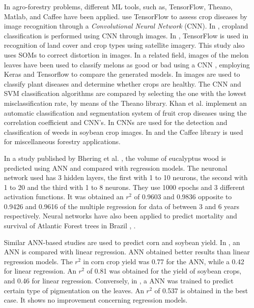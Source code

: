 \documentclass[conference]{IEEEtran}
\begin{document}
In agro-forestry problems, different ML tools, such as, TensorFlow, Theano, Matlab, and Caffee have been applied. \cite{image_recognition1450} use TensorFlow to assess crop diseases by image recognition through a \textit{Convolutional Neural Network} (CNN). In \cite{farmland_scene}, cropland classification is performed using CNN through images. In \cite{deep_learning_class123}, TensorFlow is used in recognition of land cover and crop types using satellite imagery. This study also uses SOMs to correct distortion in images. In a related field, images of the melon leaves have been used to classify melons as good or bad using a CNN \cite{bitter_melon_villa}, employing Keras and Tensorflow to compare the generated models. In \cite{cloud_based_jain} images are used to classify plant diseases and determine whether crops are healthy. The CNN and SVM classification algorithms are compared by selecting the one with the lowest misclassification rate, by means of the Theano library. Khan et al. \cite{CCDF_automatic_khan} implement an automatic classification and segmentation system of fruit crop diseases using the correlation coefficient and CNN's. In \cite{weed_detection_ferreira} CNNs are used for the detection and classification of weeds in soybean crop images. In \cite{CCDF_automatic_khan} and \cite{weed_detection_ferreira} the Caffee library is used for miscellaneous forestry applications.

In a study published by Bhering et al. \cite{application_of_bhering}, the volume of eucalyptus wood is predicted using ANN and compared with regression models. The neuronal network used has 3 hidden layers, the first with 1 to 10 neurons, the second with 1 to 20 and the third with 1 to 8 neurons. They use 1000 epochs and 3 different activation functions. It was obtained an $r^2$ of 0.9603 and 0.9836 opposite to 0.9426 and 0.9616 of the multiple regression for data of between 3 and 6 years respectively. Neural networks have also been applied to predict mortality and survival of Atlantic Forest trees in Brazil \cite{artificial_neural_rocha}, \cite{Estimation_of_Reis}.

Similar ANN-based studies are used to predict corn and soybean yield. In \cite{artificial_neural_kaul}, an ANN is compared with linear regression. ANN obtained better results than linear regression models. The $r^2$ in corn crop yield was 0.77 for the ANN, while a 0.42 for linear regression. An $r^2$ of 0.81 was obtained for the yield of soybean crops, and 0.46 for linear regression. Conversely, in \cite{artificial_neural_gabriela}, a ANN was trained to predict certain type of pigmentation on the leaves. An $r^2$ of 0.537 is obtained in the best case. It shows no improvement concerning regression models. 
\end{document}
